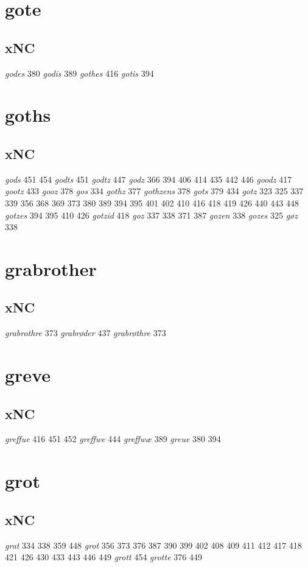 \documentclass[a4paper,twocolumn]{article}
\begin{document}
\section{gote}
\label{sec:orgc228799}
\subsection{xNC}
\label{sec:orgf4b84f1}
\emph{godes} 380 \emph{godis} 389 \emph{gothes} 416 \emph{gotis} 394 
\section{goths}
\label{sec:org659eec2}
\subsection{xNC}
\label{sec:orga7982a0}
\emph{gods} 451 454 \emph{godts} 451 \emph{godtz} 447 \emph{godz} 366 394 406 414 435 442 446 \emph{goodz} 417 \emph{gootz} 433 \emph{gooz} 378 \emph{gos} 334 \emph{gothz} 377 \emph{gothzens} 378 \emph{gots} 379 434 \emph{gotz} 323 325 337 339 356 368 369 373 380 389 394 395 401 402 410 416 418 419 426 440 443 448 \emph{gotzes} 394 395 410 426 \emph{gotzid} 418 \emph{goz} 337 338 371 387 \emph{gozen} 338 \emph{gozes} 325 \emph{gøz} 338 
\section{grabrother}
\label{sec:org6cf3b85}
\subsection{xNC}
\label{sec:org36c7938}
\emph{grabrothre} 373 \emph{grabrøder} 437 \emph{grabrøthre} 373 
\section{greve}
\label{sec:orgc576406}
\subsection{xNC}
\label{sec:org850a7ba}
\emph{greffue} 416 451 452 \emph{greffwe} 444 \emph{greffwæ} 389 \emph{greue} 380 394 
\section{grot}
\label{sec:orgdf2e45e}
\subsection{xNC}
\label{sec:org75fd306}
\emph{grat} 334 338 359 448 \emph{grot} 356 373 376 387 390 399 402 408 409 411 412 417 418 421 426 430 433 443 446 449 \emph{grott} 454 \emph{grotte} 376 449 
\end{document}
